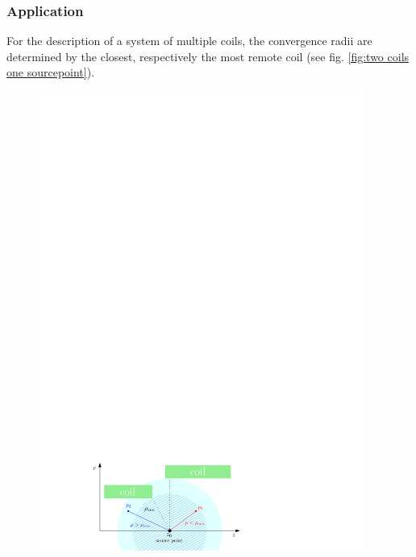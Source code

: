      \subsubsection{Application}
	For the description of a system of multiple coils, the convergence radii are determined by the closest, respectively the most remote coil (see fig. \ref{fig:two coils one sourcepoint}).
	\begin{figure}[htbp]
	      \centering
	      \begin{minipage}{0.49\textwidth}
		\includegraphics[width=0.95\textwidth]{images/KAFCAFigures/two_coils_central.pdf}
	      \end{minipage}
	      \begin{minipage}{0.49\textwidth}

\end{minipage}
\end{figure}
